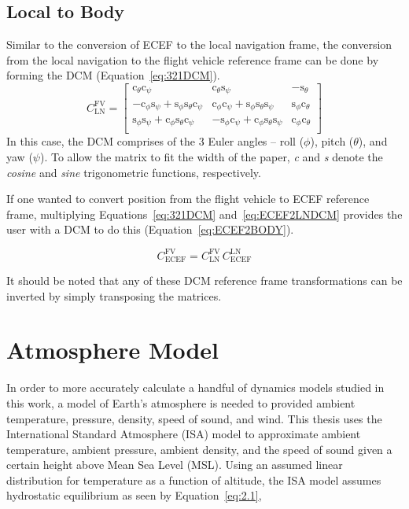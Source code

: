 \subsection{Local to Body}
Similar to the conversion of ECEF to the local navigation frame, the conversion from the local navigation to the flight vehicle reference frame can be done by forming the DCM (Equation~\ref{eq:321DCM}).
\begin{equation}\label{eq:321DCM}
    C^{\textrm{FV}}_{\textrm{LN}} =
    \begin{bmatrix}
        \textrm{c}_{\theta}\textrm{c}_{\psi}                                                        & \textrm{c}_{\theta}\textrm{s}_{\psi}                                                        & -\textrm{s}_{\theta}                 \\
        -\textrm{c}_{\phi}\textrm{s}_{\psi} + \textrm{s}_{\phi}\textrm{s}_{\theta}\textrm{c}_{\psi} & \textrm{c}_{\phi}\textrm{c}_{\psi} + \textrm{s}_{\phi}\textrm{s}_{\theta}\textrm{s}_{\psi}  & \textrm{s}_{\phi}\textrm{c}_{\theta} \\
        \textrm{s}_{\phi}\textrm{s}_{\psi} + \textrm{c}_{\phi}\textrm{s}_{\theta}\textrm{c}_{\psi}  & -\textrm{s}_{\phi}\textrm{c}_{\psi} + \textrm{c}_{\phi}\textrm{s}_{\theta}\textrm{s}_{\psi} & \textrm{c}_{\phi}\textrm{c}_{\theta} \\
    \end{bmatrix}
\end{equation}
In this case, the DCM comprises of the 3 Euler angles {--} roll (\( \phi \)), pitch (\( \theta \)), and yaw (\( \psi \)). To allow the matrix to fit the width of the paper, \textit{c} and \textit{s} denote the \textit{cosine} and \textit{sine} trigonometric functions, respectively.

If one wanted to convert position from the flight vehicle to ECEF reference frame, multiplying Equations~\ref{eq:321DCM} and~\ref{eq:ECEF2LNDCM} provides the user with a DCM to do this (Equation~\ref{eq:ECEF2BODY}).

\begin{equation}\label{eq:ECEF2BODY}
    C^{\textrm{FV}}_{\textrm{ECEF}} = C^{\textrm{FV}}_{\textrm{LN}} \, C^{\textrm{LN}}_{\textrm{ECEF}}
\end{equation}

It should be noted that any of these DCM reference frame transformations can be inverted by simply transposing the matrices.

\section{Atmosphere Model}\label{section:atmos}
In order to more accurately calculate a handful of dynamics models studied in this work, a model of Earth's atmosphere is needed to provided ambient temperature, pressure, density, speed of sound, and wind. This thesis uses the International Standard Atmosphere (ISA) model to approximate ambient temperature, ambient pressure, ambient density, and the speed of sound given a certain height above Mean Sea Level (MSL). Using an assumed linear distribution for temperature as a function of altitude, the ISA model assumes hydrostatic equilibrium as seen by Equation~\ref{eq:2.1},

